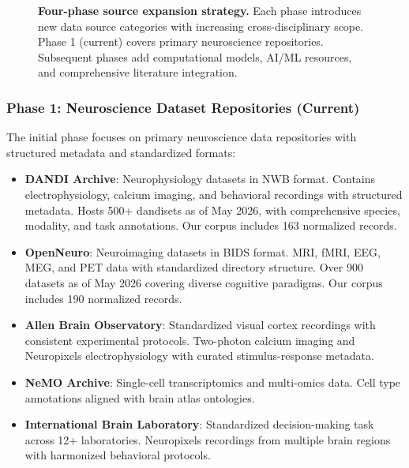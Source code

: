 \documentclass{article}
\theoremstyle{definition}
\begin{document}
\begin{figure}[t]
\caption{\textbf{Four-phase source expansion strategy.} Each phase introduces new data source categories with increasing cross-disciplinary scope. Phase 1 (current) covers primary neuroscience repositories. Subsequent phases add computational models, AI/ML resources, and comprehensive literature integration.}
\label{fig:expansion-phases}
\end{figure}

\subsubsection{Phase 1: Neuroscience Dataset Repositories (Current)}

The initial phase focuses on primary neuroscience data repositories with structured metadata and standardized formats:

\begin{itemize}
    \item \textbf{DANDI Archive}: Neurophysiology datasets in NWB format. Contains electrophysiology, calcium imaging, and behavioral recordings with structured metadata. Hosts 500+ dandisets as of May 2026, with comprehensive species, modality, and task annotations. Our corpus includes 163 normalized records.

    \item \textbf{OpenNeuro}: Neuroimaging datasets in BIDS format. MRI, fMRI, EEG, MEG, and PET data with standardized directory structure. Over 900 datasets as of May 2026 covering diverse cognitive paradigms. Our corpus includes 190 normalized records.

    \item \textbf{Allen Brain Observatory}: Standardized visual cortex recordings with consistent experimental protocols. Two-photon calcium imaging and Neuropixels electrophysiology with curated stimulus-response metadata.

    \item \textbf{NeMO Archive}: Single-cell transcriptomics and multi-omics data. Cell type annotations aligned with brain atlas ontologies.

    \item \textbf{International Brain Laboratory}: Standardized decision-making task across 12+ laboratories. Neuropixels recordings from multiple brain regions with harmonized behavioral protocols.
\end{itemize}
\end{document}
